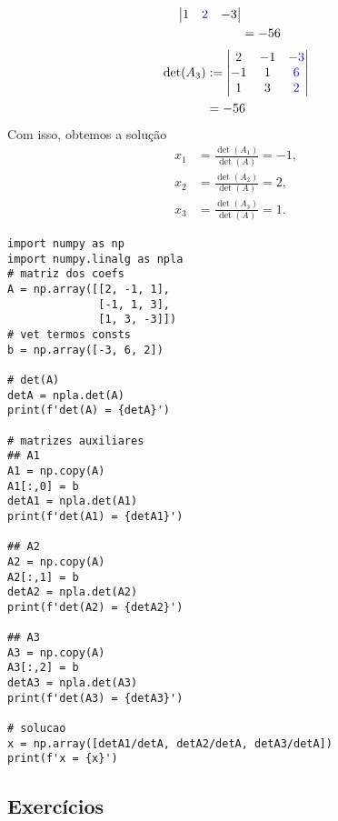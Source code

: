 \begin{ex}
\begin{subequations}
\begin{align}
\begin{vmatrix}
                  1 & {\color{blue}2} & -3
                \end{vmatrix}\\
              &= -56
    \end{align}
  \end{subequations}
  \begin{subequations}
    \begin{align}
      \det(A_3) &:=
                \begin{vmatrix}
                  2 & -1 & {\color{blue}-3}\\
                  -1 & 1 & {\color{blue}6}\\
                  1 & 3 & {\color{blue}2}
                \end{vmatrix}\\
              &= -56
    \end{align}
  \end{subequations}
  Com isso, obtemos a solução
  \begin{subequations}
    \begin{align}
      x_1 &= \frac{\det(A_1)}{\det(A)} = -1,\\
      x_2 &= \frac{\det(A_2)}{\det(A)} = 2,\\
      x_3 &= \frac{\det(A_3)}{\det(A)} = 1.
    \end{align}
  \end{subequations}

\begin{lstlisting}
import numpy as np
import numpy.linalg as npla
# matriz dos coefs
A = np.array([[2, -1, 1],
              [-1, 1, 3],
              [1, 3, -3]])
# vet termos consts
b = np.array([-3, 6, 2])

# det(A)
detA = npla.det(A)
print(f'det(A) = {detA}')

# matrizes auxiliares
## A1
A1 = np.copy(A)
A1[:,0] = b
detA1 = npla.det(A1)
print(f'det(A1) = {detA1}')

## A2
A2 = np.copy(A)
A2[:,1] = b
detA2 = npla.det(A2)
print(f'det(A2) = {detA2}')

## A3
A3 = np.copy(A)
A3[:,2] = b
detA3 = npla.det(A3)
print(f'det(A3) = {detA3}')

# solucao
x = np.array([detA1/detA, detA2/detA, detA3/detA])
print(f'x = {x}')
\end{lstlisting}
\end{ex}


\subsection{Exercícios}

